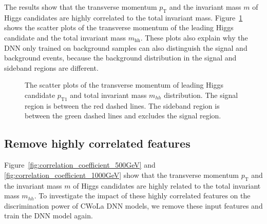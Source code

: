 \documentclass[12pt]{article}
\begin{document}
		The results show that the transverse momentum $p_\text{T}$ and the invariant mass $m$ of Higgs candidates are highly correlated to the total invariant mass. Figure~\ref{fig:pt1_mhh_scatter_plot} shows the scatter plots of the transverse momentum of the leading Higgs candidate and the total invariant mass $m_{\text{hh}}$. These plots also explain why the DNN only trained on background samples can also distinguish the signal and background events, because the background distribution in the signal and sideband regions are different.  
		\begin{figure}[htpb]
			\centering
			\caption{The scatter plots of the transverse momentum of leading Higgs candidate $p_{\text{T}1}$ and total invariant mass $m_{hh}$ distribution. The signal region is between the red dashed lines. The sideband region is between the green dashed lines and excludes the signal region.}
			\label{fig:pt1_mhh_scatter_plot}
		\end{figure}
	\subsection{Remove highly correlated features}%
	\label{sub:remove_highly_correlated_features}
		 Figure~\ref{fig:correlation_coefficient_500GeV} and \ref{fig:correlation_coefficient_1000GeV} show that the transverse momentum $p_\text{T}$ and the invariant mass $m$ of Higgs candidates are highly related to the total invariant mass $m_{hh}$. To investigate the impact of these highly correlated features on the discrimination power of CWoLa DNN models, we remove these input features and train the DNN model again.
\end{document}
